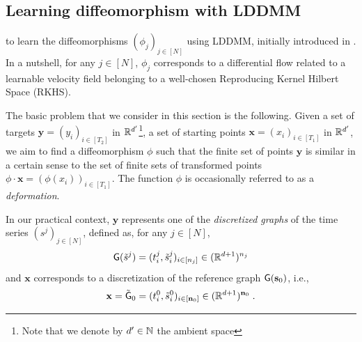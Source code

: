 
\subsection{Learning diffeomorphism with LDDMM} %
\label{section:LDDMM}
 to
 learn the diffeomorphisms $(\phi_j)_{j\in[N]}$ using LDDMM, initially introduced in \cite{beg2005computing}.
  In a nutshell, for any $j\in [N]$, $\phi_j$ corresponds to a differential flow related to a learnable velocity field belonging to a well-chosen Reproducing Kernel Hilbert Space (RKHS).

The basic problem that we consider in this section is the following. Given a set of targets $\mathbf{y}=(y_i)_{i\in[T_2]}$ in $\mathbb{R}^{d'}$\footnote{Note that we denote by $d'\in\mathbb{N}$ the ambient space}, a set of starting points $\mathbf{x}=(x_{i})_{i\in[T_1]}$ in $\mathbb{R}^{d'}$, we aim to find a diffeomorphism $\phi$ such that the finite set of points $\mathbf{y}$ is similar in a certain sense to the set of finite sets of transformed points $\phi \cdot \mathbf{x} =(\phi(x_i))_{i\in[T_1]} $.
 The function $\phi$ is occasionally referred to as a \textit{deformation}.

 In our practical context, $\mathbf{y}$ represents one of the \textit{discretized graphs} of the time series $(s^j)_{j\in[N]}$, defined as, for any $j\in[N]$,
 \begin{equation}
  \label{eq:descretized_graph}
  \mathsf{G}(\tilde{s}^j)=(t_i^j,\tilde{s}^j_i)_{ i\in[n_j]}\in (\mathbb{R}^{d+1})^{n_j}
 \end{equation}
  and $\mathbf{x}$ corresponds to a discretization of the reference graph $\mathsf{G}(\mathbf{s}_0)$, i.e., 
  \begin{equation}
    \label{eq:descretized_referenced_graph}
    \mathbf{x}=\tilde{\mathsf{G}}_0=(t_i^0,\tilde{s}^0_i)_{i\in[\mathbf{n}_0]}\in (\mathbb{R}^{d+1})^{\mathbf{n}_0} \; . 
  \end{equation} 
